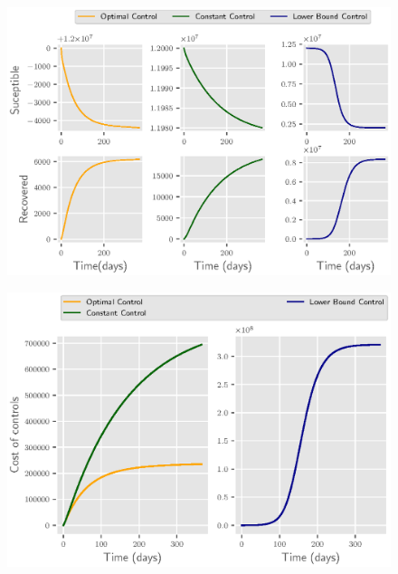 \begin{figure}[htb]
  \centering
  \includegraphics{Figures/figure_2_sars}
  \caption{}
  \label{fig:figure2sars}
\end{figure}

\begin{figure}[htb]
  \centering
  \includegraphics{Figures/figure_3_sars}
  \caption{}
  \label{fig:figure3sars}
\end{figure}